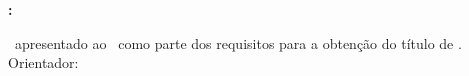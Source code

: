\documentclass[main.tex]{subfiles}
\begin{document}
\begin{titlepage}

\begin{center}
    \large %
    \MakeUppercase{\autores}
\end{center}

\vspace{4cm} %

\begin{center}
    \large
    \textbf{\MakeUppercase{\nomeprojeto}: \subtituloprojeto}
\end{center}

\vfill %

\begin{flushright}
    \begin{minipage}[t]{0.5\textwidth} %
        \raggedleft
        \justify
        \tipotrabalho\ apresentado ao \instituicao\ como parte dos requisitos para a obtenção do título de \curso.
        \newline
        \newline
        Orientador: \orientador
    \end{minipage}
\end{flushright}

\vfill %

\begin{center}
    \large
    \MakeUppercase{\cidade}\\
    \ano
\end{center}

\end{titlepage}
\end{document}
